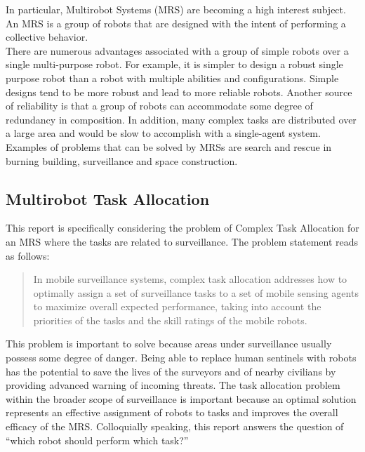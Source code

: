 \documentclass[a4paper]{article}
\begin{document}
In particular, Multirobot Systems (MRS) are becoming a high interest subject. An MRS is a group of robots that are designed with the intent of performing a collective behavior.\\
There are numerous advantages associated with a group of simple robots over a single multi-purpose robot. For example, it is simpler to design a robust single purpose robot than a robot with multiple abilities and configurations. Simple designs tend to be more robust and lead to more reliable robots. Another source of reliability is that a group of robots can accommodate some degree of redundancy in composition.  In addition, many complex tasks are distributed over a large area and would be slow to accomplish with a single-agent system. Examples of problems that can be solved by MRSs are search and rescue in burning building, surveillance and space construction.\\

\subsection{Multirobot Task Allocation}
This report is specifically considering the problem of Complex Task Allocation for an MRS where the tasks are related to surveillance. The problem statement reads as follows:\\
\blockquote{In mobile surveillance systems, complex task allocation addresses how to optimally assign a set of surveillance tasks to a set of mobile sensing agents to maximize overall expected performance, taking into account the priorities of the tasks and the skill ratings of the mobile robots.}
This problem is important to solve because areas under surveillance usually possess some degree of danger. Being able to replace human sentinels with robots has the potential to save the lives of the surveyors and of nearby civilians by providing advanced warning of incoming threats. The task allocation problem within the broader scope of surveillance is important because an optimal solution represents an effective assignment of robots to tasks and improves the overall efficacy of the MRS. Colloquially speaking, this report answers the question of ``which robot should perform which task?''\cite{Badreldin}


\end{document}
